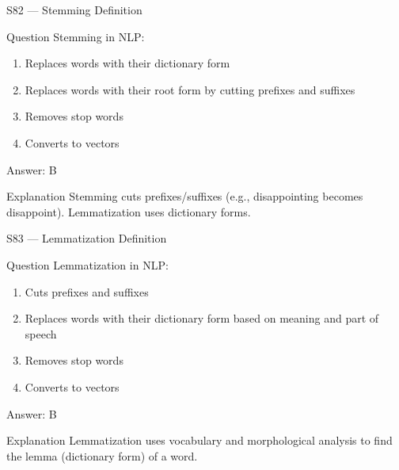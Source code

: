 \documentclass[aspectratio=169,8pt]{beamer}
\begin{document}
	\begin{frame}{S82 --- Stemming Definition}
		\begin{block}{Question}
			Stemming in NLP:
			\begin{enumerate}
				\item Replaces words with their dictionary form
				\item Replaces words with their root form by cutting prefixes and suffixes
				\item Removes stop words
				\item Converts to vectors
			\end{enumerate}
		\end{block}
		\begin{exampleblock}{Answer: B}\end{exampleblock}
		\begin{block}{Explanation}
			Stemming cuts prefixes/suffixes (e.g., disappointing becomes disappoint). Lemmatization uses dictionary forms.
		\end{block}
	\end{frame}
	
	\begin{frame}{S83 --- Lemmatization Definition}
		\begin{block}{Question}
			Lemmatization in NLP:
			\begin{enumerate}
				\item Cuts prefixes and suffixes
				\item Replaces words with their dictionary form based on meaning and part of speech
				\item Removes stop words
				\item Converts to vectors
			\end{enumerate}
		\end{block}
		\begin{exampleblock}{Answer: B}\end{exampleblock}
		\begin{block}{Explanation}
			Lemmatization uses vocabulary and morphological analysis to find the lemma (dictionary form) of a word.
		\end{block}
	\end{frame}
	
\end{document}
